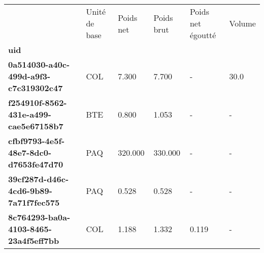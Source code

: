 \begin{tabularx}{\linewidth}{lXXXXX}
\toprule
{} & Unité de base &  Poids net &  Poids brut &  Poids net égoutté &  Volume \\
\textbf{uid                                 } &               &            &             &                    &         \\
\midrule
\textbf{0a514030-a40c-499d-a9f3-c7c319302c47} &           COL &      7.300 &       7.700 &                  - &    30.0 \\
\textbf{f254910f-8562-431e-a499-cae5e67158b7} &           BTE &      0.800 &       1.053 &                  - &       - \\
\textbf{cfbf9793-4e5f-48e7-8dc0-d7653fe47d70} &           PAQ &    320.000 &     330.000 &                  - &       - \\
\textbf{39cf287d-d46c-4cd6-9b89-7a71f7fec575} &           PAQ &      0.528 &       0.528 &                  - &       - \\
\textbf{8c764293-ba0a-4103-8465-23a4f5eff7bb} &           COL &      1.188 &       1.332 &              0.119 &       - \\
\bottomrule
\end{tabularx}
